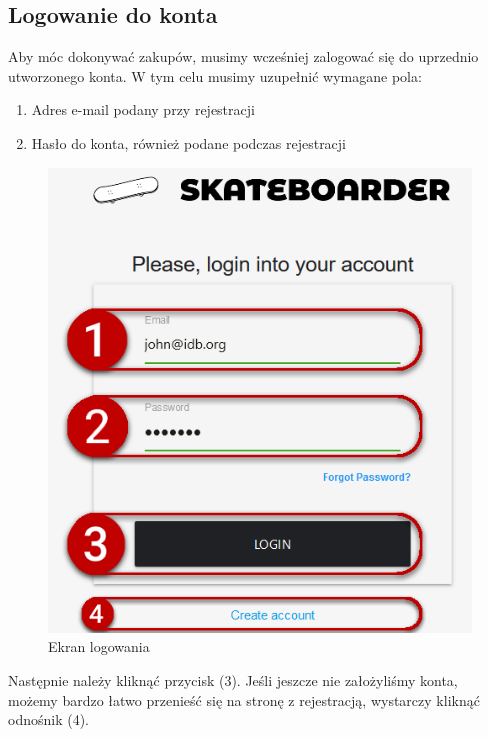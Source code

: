 \documentclass[12pt,a4paper,titlepage]{article}
\begin{document}
\subsection{Logowanie do konta}
Aby móc dokonywać zakupów, musimy wcześniej zalogować się do uprzednio utworzonego konta. W tym celu musimy uzupełnić wymagane pola:
\begin{enumerate}
    \item Adres e-mail podany przy rejestracji
    \item Hasło do konta, również podane podczas rejestracji
\end{enumerate}
\begin{figure}[H]
    \centering
    \includegraphics[scale=.5]{Pics/login.png}
    \caption{Ekran logowania}
    \label{pic:login}
\end{figure}
Następnie należy kliknąć przycisk (3). Jeśli jeszcze nie założyliśmy konta, możemy bardzo łatwo przenieść się na stronę z rejestracją, wystarczy kliknąć odnośnik (4).
\end{document}
